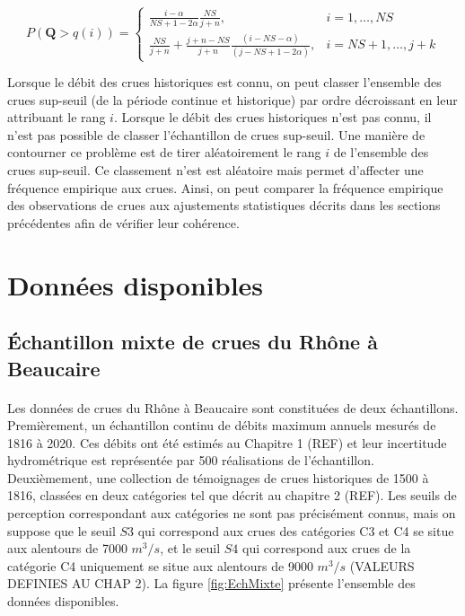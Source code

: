 \documentclass[11pt]{article}
\begin{document}
		\begin{equation}	
		P(\boldsymbol{Q} > q(i)) = \begin{cases}\frac{i-\alpha}{NS+1-2 \alpha} \frac{NS}{j+n}, & i=1, \ldots, NS \\ \frac{NS}{j+n}+\frac{j+n-NS}{j+n} \frac{(i-NS-\alpha)}{(j-NS+1-2\alpha)}, & i=NS+1, \ldots, j+k\end{cases}
		\label{eq:FreqHisto}	
		\end{equation}
	
	Lorsque le débit des crues historiques est connu, on peut classer l'ensemble des crues sup-seuil (de la période continue et historique) par ordre décroissant en leur attribuant le rang $i$. Lorsque le débit des crues historiques n'est pas connu, il n'est pas possible de classer l'échantillon de crues sup-seuil. Une manière de contourner ce problème est de tirer aléatoirement le rang $i$ de l'ensemble des crues sup-seuil. Ce classement n'est est aléatoire mais permet d'affecter une fréquence empirique aux crues. Ainsi, on peut comparer la fréquence empirique des observations de crues aux ajustements statistiques décrits dans les sections précédentes afin de vérifier leur cohérence. 
		
\section{Données disponibles}

	\subsection{Échantillon mixte de crues du Rhône à Beaucaire}
	\paragraph{} Les données de crues du Rhône à Beaucaire sont constituées de deux échantillons. Premièrement, un échantillon continu de débits maximum annuels mesurés de 1816 à 2020. Ces débits ont été estimés au Chapitre 1 (REF) et leur incertitude hydrométrique est représentée par 500 réalisations de l'échantillon. Deuxièmement, une collection de témoignages de crues historiques de 1500 à 1816, classées en deux catégories tel que décrit au chapitre 2 (REF). Les seuils de perception correspondant aux catégories ne sont pas précisément connus, mais on suppose que le seuil $S3$ qui correspond aux crues des catégories C3 et C4 se situe aux alentours de 7000 $m^3/s$, et le seuil $S4$ qui correspond aux crues de la catégorie C4 uniquement se situe aux alentours de 9000 $m^3/s$ (VALEURS DEFINIES AU CHAP 2). La figure \ref{fig:EchMixte} présente l'ensemble des données disponibles. 
	
\end{document}
